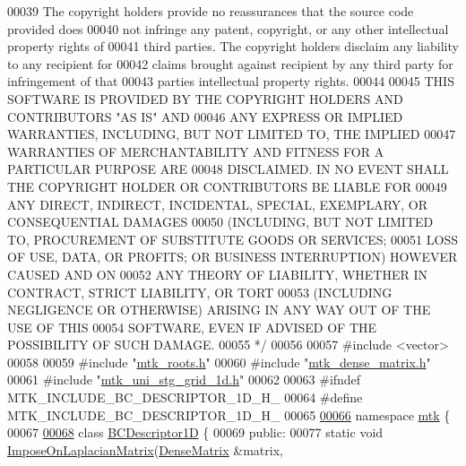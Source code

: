 \begin{DoxyCode}
00039 \textcolor{comment}{The copyright holders provide no reassurances that the source code provided does}
00040 \textcolor{comment}{not infringe any patent, copyright, or any other intellectual property rights of}
00041 \textcolor{comment}{third parties. The copyright holders disclaim any liability to any recipient for}
00042 \textcolor{comment}{claims brought against recipient by any third party for infringement of that}
00043 \textcolor{comment}{parties intellectual property rights.}
00044 \textcolor{comment}{}
00045 \textcolor{comment}{THIS SOFTWARE IS PROVIDED BY THE COPYRIGHT HOLDERS AND CONTRIBUTORS "AS IS" AND}
00046 \textcolor{comment}{ANY EXPRESS OR IMPLIED WARRANTIES, INCLUDING, BUT NOT LIMITED TO, THE IMPLIED}
00047 \textcolor{comment}{WARRANTIES OF MERCHANTABILITY AND FITNESS FOR A PARTICULAR PURPOSE ARE}
00048 \textcolor{comment}{DISCLAIMED. IN NO EVENT SHALL THE COPYRIGHT HOLDER OR CONTRIBUTORS BE LIABLE FOR}
00049 \textcolor{comment}{ANY DIRECT, INDIRECT, INCIDENTAL, SPECIAL, EXEMPLARY, OR CONSEQUENTIAL DAMAGES}
00050 \textcolor{comment}{(INCLUDING, BUT NOT LIMITED TO, PROCUREMENT OF SUBSTITUTE GOODS OR SERVICES;}
00051 \textcolor{comment}{LOSS OF USE, DATA, OR PROFITS; OR BUSINESS INTERRUPTION) HOWEVER CAUSED AND ON}
00052 \textcolor{comment}{ANY THEORY OF LIABILITY, WHETHER IN CONTRACT, STRICT LIABILITY, OR TORT}
00053 \textcolor{comment}{(INCLUDING NEGLIGENCE OR OTHERWISE) ARISING IN ANY WAY OUT OF THE USE OF THIS}
00054 \textcolor{comment}{SOFTWARE, EVEN IF ADVISED OF THE POSSIBILITY OF SUCH DAMAGE.}
00055 \textcolor{comment}{*/}
00056 
00057 \textcolor{preprocessor}{#include <vector>}
00058 
00059 \textcolor{preprocessor}{#include "\hyperlink{mtk__roots_8h}{mtk\_roots.h}"}
00060 \textcolor{preprocessor}{#include "\hyperlink{mtk__dense__matrix_8h}{mtk\_dense\_matrix.h}"}
00061 \textcolor{preprocessor}{#include "\hyperlink{mtk__uni__stg__grid__1d_8h}{mtk\_uni\_stg\_grid\_1d.h}"}
00062 
00063 \textcolor{preprocessor}{#ifndef MTK\_INCLUDE\_BC\_DESCRIPTOR\_1D\_H\_}
00064 \textcolor{preprocessor}{#define MTK\_INCLUDE\_BC\_DESCRIPTOR\_1D\_H\_}
00065 
\hypertarget{mtk__bc__descriptor__1d_8h_source_l00066}{}\hyperlink{namespacemtk}{00066} \textcolor{keyword}{namespace }\hyperlink{namespacemtk}{mtk} \{
00067 
\hypertarget{mtk__bc__descriptor__1d_8h_source_l00068}{}\hyperlink{classmtk_1_1BCDescriptor1D}{00068} \textcolor{keyword}{class }\hyperlink{classmtk_1_1BCDescriptor1D}{BCDescriptor1D} \{
00069  \textcolor{keyword}{public}:
00077   \textcolor{keyword}{static} \textcolor{keywordtype}{void} \hyperlink{classmtk_1_1BCDescriptor1D_a33e51235eaa930e4470f027001a023cf}{ImposeOnLaplacianMatrix}(\hyperlink{classmtk_1_1DenseMatrix}{DenseMatrix} &matrix,

\end{DoxyCode}
